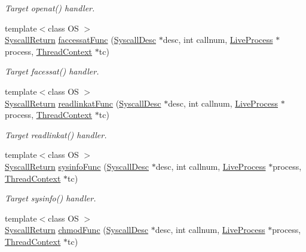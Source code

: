 \begin{DoxyCompactItemize}
\begin{DoxyCompactList}\small\item\em Target openat() handler. \item\end{DoxyCompactList}\item 
{\footnotesize template$<$class OS $>$ }\\\hyperlink{classSyscallReturn}{SyscallReturn} \hyperlink{syscall__emul_8hh_acc50ca24090796bbabb2797298ebfdef}{faccessatFunc} (\hyperlink{classSyscallDesc}{SyscallDesc} $\ast$desc, int callnum, \hyperlink{classLiveProcess}{LiveProcess} $\ast$process, \hyperlink{classThreadContext}{ThreadContext} $\ast$tc)
\begin{DoxyCompactList}\small\item\em Target facessat() handler. \item\end{DoxyCompactList}\item 
{\footnotesize template$<$class OS $>$ }\\\hyperlink{classSyscallReturn}{SyscallReturn} \hyperlink{syscall__emul_8hh_aa7c9ee715f608210172fa284884d6ae7}{readlinkatFunc} (\hyperlink{classSyscallDesc}{SyscallDesc} $\ast$desc, int callnum, \hyperlink{classLiveProcess}{LiveProcess} $\ast$process, \hyperlink{classThreadContext}{ThreadContext} $\ast$tc)
\begin{DoxyCompactList}\small\item\em Target readlinkat() handler. \item\end{DoxyCompactList}\item 
{\footnotesize template$<$class OS $>$ }\\\hyperlink{classSyscallReturn}{SyscallReturn} \hyperlink{syscall__emul_8hh_a6a54d59c2aacf12179e4ab68440f29b4}{sysinfoFunc} (\hyperlink{classSyscallDesc}{SyscallDesc} $\ast$desc, int callnum, \hyperlink{classLiveProcess}{LiveProcess} $\ast$process, \hyperlink{classThreadContext}{ThreadContext} $\ast$tc)
\begin{DoxyCompactList}\small\item\em Target sysinfo() handler. \item\end{DoxyCompactList}\item 
{\footnotesize template$<$class OS $>$ }\\\hyperlink{classSyscallReturn}{SyscallReturn} \hyperlink{syscall__emul_8hh_a8efc7888235c588ed8456c16d4c6f1ab}{chmodFunc} (\hyperlink{classSyscallDesc}{SyscallDesc} $\ast$desc, int callnum, \hyperlink{classLiveProcess}{LiveProcess} $\ast$process, \hyperlink{classThreadContext}{ThreadContext} $\ast$tc)

\end{DoxyCompactItemize}
